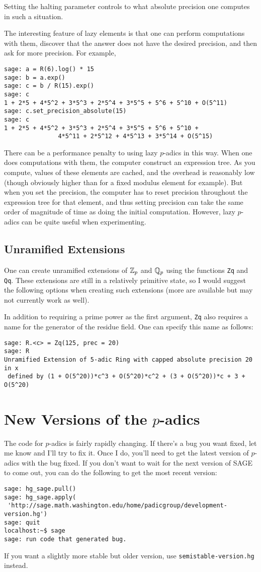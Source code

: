 \documentclass[12pt]{article}
\begin{document}
Setting the halting parameter controls to what absolute precision one computes in such a situation.

The interesting feature of lazy elements is that one can perform computations with them, discover that the answer does not have the desired precision, and then ask for more precision.  For example,
\begin{verbatim}
sage: a = R(6).log() * 15
sage: b = a.exp()
sage: c = b / R(15).exp()
sage: c
1 + 2*5 + 4*5^2 + 3*5^3 + 2*5^4 + 3*5^5 + 5^6 + 5^10 + O(5^11)
sage: c.set_precision_absolute(15)
sage: c
1 + 2*5 + 4*5^2 + 3*5^3 + 2*5^4 + 3*5^5 + 5^6 + 5^10 +
               4*5^11 + 2*5^12 + 4*5^13 + 3*5^14 + O(5^15)
\end{verbatim}

There can be a performance penalty to using lazy $p$-adics in this way.  When one does computations with them, the computer construct an expression tree.  As you compute, values of these elements are cached, and the overhead is reasonably low (though obviously higher than for a fixed modulus element for example).  But when you set the precision, the computer has to reset precision throughout the expression tree for that element, and thus setting precision can take the same order of magnitude of time as doing the initial computation.  However, lazy $p$-adics can be quite useful when experimenting.

\subsection{Unramified Extensions}
One can create unramified extensions of $\mathbb{Z}_p$ and $\mathbb{Q}_p$ using the functions \verb/Zq/ and \verb/Qq/.
These extensions are still in a relatively primitive state,
so I would suggest the following options when creating such extensions (more are available but may
not currently work as well).

In addition to requiring a prime power as the first argument, \verb/Zq/ also requires a name for the generator of the residue field.  One can specify this name as follows:
\begin{verbatim}
sage: R.<c> = Zq(125, prec = 20)
sage: R
Unramified Extension of 5-adic Ring with capped absolute precision 20 in x
 defined by (1 + O(5^20))*c^3 + O(5^20)*c^2 + (3 + O(5^20))*c + 3 + O(5^20)
\end{verbatim}

\section{New Versions of the $p$-adics}
The code for $p$-adics is fairly rapidly changing.  If there's a bug you want fixed, let me know and I'll try to fix it.  Once I do, you'll need to get the latest version of $p$-adics with the bug fixed.  If you don't want to wait for the next version of SAGE to come out, you can do the following to get the most recent version:
\begin{verbatim}
sage: hg_sage.pull()
sage: hg_sage.apply(
 'http://sage.math.washington.edu/home/padicgroup/development-version.hg')
sage: quit
localhost:~$ sage
sage: run code that generated bug.
\end{verbatim}

If you want a slightly more stable but older version, use \verb/semistable-version.hg/ instead.
\end{document}
